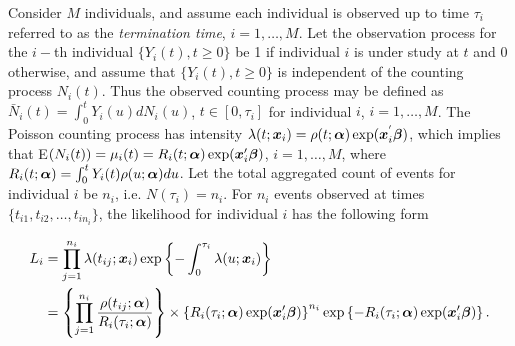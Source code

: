 \documentclass[12pt]{article}
\def \alph{\mbox{\boldmath $\alpha$ \unboldmath}\!\!}
\def \bet{\mbox{\boldmath $\beta$ \unboldmath}\!\!}
\def \bx{\mbox{\boldmath $x$ \unboldmath}\!\!}
\begin{document}
Consider $M$ individuals, and assume each individual is observed up to time $\tau_i$ referred to as the {\it termination time}, $i=1,\ldots, M$. Let the observation process for the $i-$th individual $\{Y_i(t), t \geq 0 \}$ be 1 if individual 
$i$ is under study at $t$ and 0 otherwise, and  assume that $\{Y_i(t), t\geq 0 \}$  is independent of the counting process $N_{i}(t)$. Thus the observed counting process may be defined as $\bar{N}_{i}(t)=\int^{t}_{0}Y_i(u)dN_i(u) $, $t\in [0,\tau_i]$ for individual $i$, $i=1, \ldots, M$. The Poisson counting process has intensity $\lambda(t;\bx_i)=\rho(t;\alph) \exp ( {\bx}_{i}^{'} \bet )$, which implies that E$(N_i(t))=\mu_i(t)=R_{i}(t;\alph)\exp (\bx'_i \bet)$, $i =1, \ldots, M$, where $R_{i}(t;\alph)=\int_{0}^t Y_i(t) \rho(u;\alph) du$. Let the total aggregated count of events for individual $i$ be $n_{i}$, i.e. $N(\tau_i)=n_i$. For $n_i$ events observed at times $\{t_{i1},t_{i2},\ldots,t_{i n_i}\}$, the likelihood for individual $i$ has the following form \citep{lawless1987regression}

\begin{align}
L_i &=\prod_{j=1}^{n_i} \lambda(t_{ij};\bx_i) \exp \left\{- \int_{0}^{\tau_i} \lambda(u;\bx_i) \right\} \\
&=\left\{ \prod_{j=1}^{n_i} \frac{\rho(t_{ij};\alph)}{R_{i}(\tau_{i};\alph)}  \right\} \times \left\{ R_{i}(\tau_{i};\alph) \exp (\bx_i' \bet) \right\}^{n_i} \exp  \left\{- R_{i}(\tau_{i};\alph) \exp (\bx_i' \bet) \right\}.
\label{eq:lik-pois}
\end{align}
\end{document}
